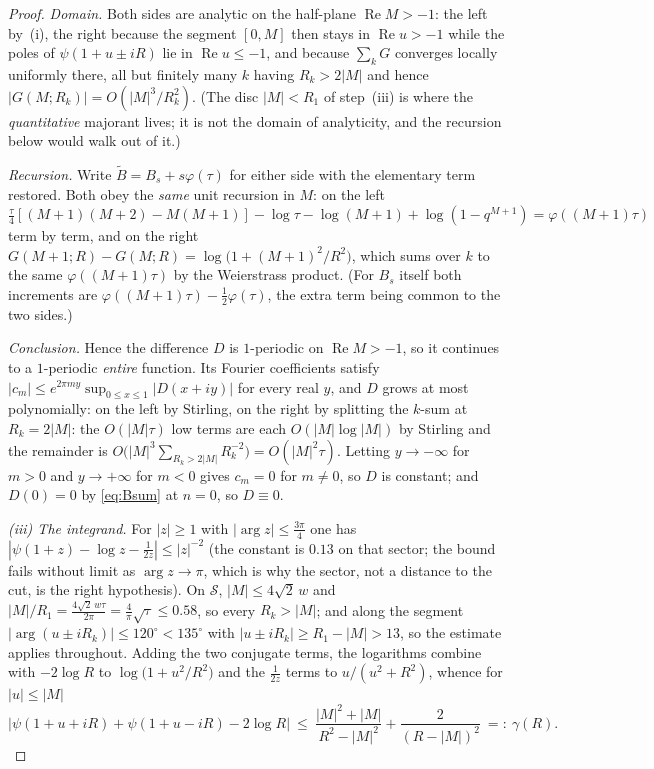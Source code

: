 \documentclass[11pt]{article}
\theoremstyle{plain}
\theoremstyle{definition}
\theoremstyle{remark}
\renewcommand{\Re}{\operatorname{Re}}
\begin{document}
\begin{proof}
\emph{Domain.} Both sides are analytic on the half-plane $\Re M>-1$: the left by~(i), the right
because the segment $[0,M]$ then stays in $\Re u>-1$ while the poles of $\psi(1{+}u\pm iR)$ lie in
$\Re u\le-1$, and because $\sum_kG$ converges locally uniformly there, all but finitely many $k$
having $R_k>2|M|$ and hence $|G(M;R_k)|=O(|M|^3/R_k^2)$. (The disc $|M|<R_1$ of step~(iii) is where
the \emph{quantitative} majorant lives; it is not the domain of analyticity, and the recursion
below would walk out of it.)

\emph{Recursion.} Write $\widetilde B=B_s+s\varphi(\tau)$ for either side with the elementary term
restored. Both obey the \emph{same} unit recursion in $M$: on the left
$\tfrac\tau4[(M{+}1)(M{+}2)-M(M{+}1)]-\log\tau-\log(M{+}1)+\log(1-q^{M+1})=\varphi((M{+}1)\tau)$
term by term, and on the right $G(M{+}1;R)-G(M;R)=\log\bigl(1+(M{+}1)^2/R^2\bigr)$, which sums over
$k$ to the same $\varphi((M{+}1)\tau)$ by the Weierstrass product. (For $B_s$ itself both
increments are $\varphi((M{+}1)\tau)-\tfrac12\varphi(\tau)$, the extra term being common to the two
sides.)

\emph{Conclusion.} Hence the difference $D$ is $1$-periodic on $\Re M>-1$, so it continues to a
$1$-periodic \emph{entire} function. Its Fourier coefficients satisfy
$|c_m|\le e^{2\pi my}\sup_{0\le x\le1}|D(x{+}iy)|$ for every real $y$, and $D$ grows at most
polynomially: on the left by Stirling, on the right by splitting the $k$-sum at $R_k=2|M|$: the
$O(|M|\tau)$ low terms are each $O(|M|\log|M|)$ by Stirling and the remainder is
$O\bigl(|M|^3\sum_{R_k>2|M|}R_k^{-2}\bigr)=O(|M|^2\tau)$. Letting $y\to-\infty$ for $m>0$ and
$y\to+\infty$ for $m<0$ gives $c_m=0$ for $m\ne0$, so $D$ is constant; and $D(0)=0$ by
\eqref{eq:Bsum} at $n=0$, so $D\equiv0$.

\emph{(iii) The integrand.} For $|z|\ge1$ with $|\arg z|\le\tfrac{3\pi}4$ one has
$|\psi(1{+}z)-\log z-\tfrac1{2z}|\le|z|^{-2}$ (the constant is $0.13$ on that sector; the bound
fails without limit as $\arg z\to\pi$, which is why the sector, not a distance to the cut, is the
right hypothesis). On $\mathcal S$, $|M|\le4\sqrt2\,w$ and
$|M|/R_1=\tfrac{4\sqrt2\,w\tau}{2\pi}=\tfrac{4}{\pi}\sqrt{\tau}\le0.58$, so every $R_k>|M|$; and
along the segment $|\arg(u\pm iR_k)|\le120^\circ<135^\circ$ with $|u\pm iR_k|\ge R_1-|M|>13$, so
the estimate applies throughout. Adding the two conjugate terms, the logarithms
combine with $-2\log R$ to $\log\bigl(1+u^2/R^2\bigr)$ and the $\tfrac1{2z}$ terms to
$u/(u^2{+}R^2)$, whence for $|u|\le|M|$
\[
   \bigl|\psi(1{+}u{+}iR)+\psi(1{+}u{-}iR)-2\log R\bigr|
   \ \le\ \frac{|M|^2+|M|}{R^2-|M|^2}+\frac{2}{(R-|M|)^2}\ =:\ \gamma(R).
\]


\end{proof}
\end{document}
